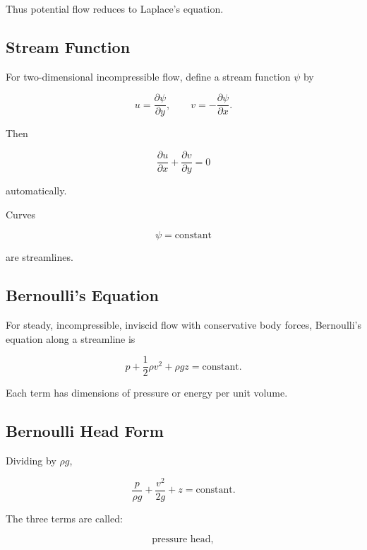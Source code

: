 Thus potential flow reduces to Laplace's equation.

\subsection{Stream Function}
\label{subsec:stream-function}

For two-dimensional incompressible flow, define a stream function \(\psi\)
by

\[
\boxed{
u
=
\frac{\partial\psi}{\partial y},
\qquad
v
=
-\frac{\partial\psi}{\partial x}.
}
\]

Then

\[
\frac{\partial u}{\partial x}
+
\frac{\partial v}{\partial y}
=
0
\]

automatically.

Curves

\[
\boxed{
\psi=\text{constant}
}
\]

are streamlines.

\subsection{Bernoulli's Equation}
\label{subsec:bernoulli-equation}

For steady, incompressible, inviscid flow with conservative body forces,
Bernoulli's equation along a streamline is

\[
\boxed{
p
+
\frac12\rho v^2
+
\rho gz
=
\text{constant}.
}
\]

Each term has dimensions of pressure or energy per unit volume.

\subsection{Bernoulli Head Form}
\label{subsec:bernoulli-head}

Dividing by \(\rho g\),

\[
\boxed{
\frac{p}{\rho g}
+
\frac{v^2}{2g}
+
z
=
\text{constant}.
}
\]

The three terms are called:

\[
\boxed{
\text{pressure head},
}
\]

